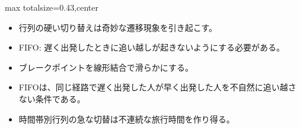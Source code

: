 \clearpage
{}
\begin{minipage}[t]{0.405\textwidth}
\begin{adjustbox}{max totalsize={\textwidth}{0.43\textheight},center}
\begin{minipage}{\textwidth}\scriptsize
{}\begin{itemize}
\item 行列の硬い切り替えは奇妙な遷移現象を引き起こす。
\item FIFO: 遅く出発したときに追い越しが起きないようにする必要がある。
\item ブレークポイントを線形結合で滑らかにする。
\end{itemize}\begin{itemize}
\item FIFOは、同じ経路で遅く出発した人が早く出発した人を不自然に追い越さない条件である。
\item 時間帯別行列の急な切替は不連続な旅行時間を作り得る。
\end{itemize}
\end{minipage}
\end{adjustbox}
\end{minipage}\hfill
